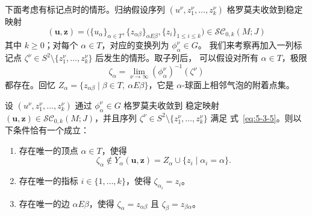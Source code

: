 下面考虑有标记点时的情形。归纳假设序列
$(u^\nu,z_1^\nu,\ldots,z_k^\nu)$ 格罗莫夫收敛到稳定映射
\[
  (\mathbf u,\mathbf z)
  =\bigl(\{u_\alpha\}_{\alpha\in T},
    \{z_{\alpha\beta}\}_{\alpha E\beta},
    \{z_i\}_{1\le i\le k}\bigr)
  \in\mathcal{SC}_{0,k}(M;J)
\]
其中 $k\ge0$；对每个 $\alpha\in T$，对应的变换列为 $\phi_\alpha^\nu\in G$。
我们来考察再加入一列标记点
$\zeta^\nu\in S^2\setminus\{z_1^\nu,\ldots,z_k^\nu\}$
 后发生的情形。取子列后，
可以假设对所有 $\alpha\in T$，极限
\begin{equation}\label{eq:5-3-5}
  \zeta_\alpha=\lim_{\nu\to\infty}(\phi_\alpha^\nu)^{-1}(\zeta^\nu)
\end{equation}
都存在。回忆
$Z_\alpha=\{z_{\alpha\beta}\mid\beta\in T,\ \alpha E\beta\}$，它是
$\alpha$-球面上相邻气泡的附着点集。

\begin{lemma}\label{lem:5-3-4}
设 $(u^\nu,z_1^\nu,\ldots,z_k^\nu)$ 通过 $\phi_\alpha^\nu\in G$ 格罗莫夫收敛到
稳定映射 $(\mathbf u,\mathbf z)\in\mathcal{SC}_{0,k}(M;J)$，并且序列
$\zeta^\nu\in S^2\setminus\{z_1^\nu,\ldots,z_k^\nu\}$ 满足
式~\eqref{eq:5-3-5}。则以下条件恰有一个成立：
\begin{enumerate}[label=(\Roman*),leftmargin=3em]
\item 存在唯一的顶点 $\alpha\in T$，使得
\[
  \zeta_\alpha\notin
  Y_\alpha(\mathbf u,\mathbf z)
  =Z_\alpha\cup\{z_i\mid\alpha_i=\alpha\}.
\]

\item 存在唯一的指标 $i\in\{1,\ldots,k\}$，使得
$\zeta_{\alpha_i}=z_i$。

\item 存在唯一的边 $\alpha E\beta$，使得
$\zeta_\alpha=z_{\alpha\beta}$ 且 $\zeta_\beta=z_{\beta\alpha}$。
\end{enumerate}
\end{lemma}

